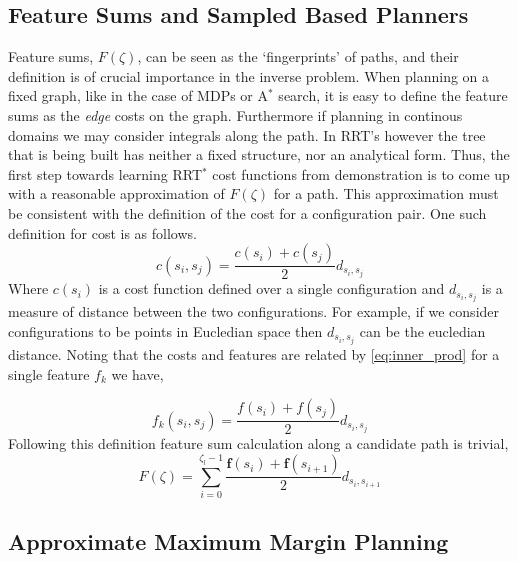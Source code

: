 \documentclass{article}  %
\begin{document}
	\subsection{Feature Sums and Sampled Based Planners}
		Feature sums, $F(\zeta)$, can be seen as the  `fingerprints' of paths, and their definition is of crucial importance in the inverse problem. When planning on a fixed graph, like in the case of MDPs or A$^*$ search, it is easy to define the feature sums as the \emph{edge} costs on the graph. Furthermore if planning in continous domains we may consider integrals along the path. In RRT's however the tree that is being built has neither a fixed structure, nor an analytical form. Thus, the first step towards learning RRT$^*$ cost functions from demonstration is to come up with a reasonable approximation of $F(\zeta)$ for a path. This approximation must be consistent with the definition of the cost for a configuration pair. One such definition for cost is as follows.
		\begin{equation}
			c(s_i,s_j) = \frac{c(s_i)+c(s_j)}{2}d_{s_i,s_j}
		\end{equation}
		Where $c(s_i)$ is a cost function defined over a single configuration and $d_{s_i,s_j}$ is a measure of distance between the two configurations. For example, if we consider configurations to be points in Eucledian space then $d_{s_i,s_j}$ can be the eucledian distance. Noting that the costs and features are related by \eqref{eq:inner_prod} for a single feature $f_k$ we have,

		\begin{equation}
			f_k(s_i,s_j) = \frac{f(s_i)+f(s_j)}{2}d_{s_i,s_j}
		\end{equation}
		Following this definition feature sum calculation along a candidate path is trivial,
		\begin{equation}
			F(\zeta) = \sum_{i=0}^{\zeta_l-1} \frac{\mathbf{f}(s_i)+\mathbf{f}(s_{i+1})}{2}d_{s_i,s_{i+1}}
		\end{equation}



	\subsection{Approximate Maximum Margin Planning \label{subsec:ammp}}
\end{document}
